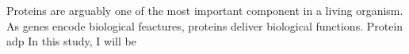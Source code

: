Proteins are arguably one of the most important component in a living organism. As genes encode biological feactures, proteins deliver biological functions. Protein adp In this study, I will be 